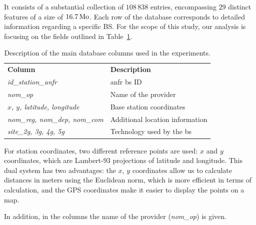 \documentclass[lettersize,journal,english]{IEEEtran}
\begin{document}
        It consists of a substantial collection of $108\,838$ entries, encompassing $29$ distinct features of a size of $\unit[16.7]{Mo}$.
        Each row of the database corresponds to detailed information regarding a specific BS. For the scope of this study, our analysis is focusing on the fields outlined in Table~\ref{table:data_columns}.
        \begin{table}
            \centering
            \caption{Description of the main database columns used in the experiments.}
            \label{table:data_columns}
            \begin{tabular}{ll}
                \toprule
                \textbf{Column} & \textbf{Description} \\
                \cmidrule(lr){1-2}
                \textsl{id\_station\_anfr} & \acrshort{anfr} \acrshort{bs} ID \\ 
                \textsl{nom\_op} & Name of the provider \\
                \textsl{$x$, $y$, latitude, longitude} & Base station coordinates \\ 
                \textsl{nom\_reg, nom\_dep, nom\_com} & Additional location information \\  
                \textsl{site\_2g, 3g, 4g, 5g} & Technology used by the \acrshort{bs} \\ 
                \bottomrule
            \end{tabular}
        \end{table}

        For station coordinates, two different reference points are used: $x$ and $y$ coordinates, which are Lambert-93 projections of latitude and longitude.
        This dual system has two advantages: the $x$, $y$ coordinates allow us to calculate distances in meters using the Euclidean norm, which is more efficient in terms of calculation, and the GPS coordinates make it easier to display the points on a map.

        In addition, in the columns the name of the provider (\textsl{nom\_op}) is given.
\end{document}
